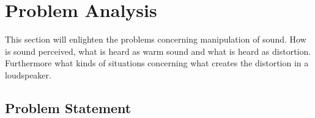 \chapter{Problem Analysis}

This section will enlighten the problems concerning manipulation of sound. How is sound perceived, what is heard as warm sound and what is heard as distortion. Furthermore what kinds of situations concerning what creates the distortion in a loudspeaker. 







\section{Problem Statement}